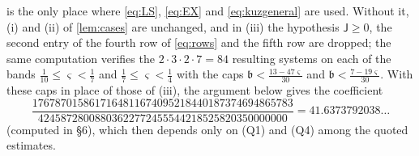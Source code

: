 \documentclass[11pt,colorlinks]{charlie}
\begin{document}
\begin{remark}\label{rem:fallback}
 is the only place where \eqref{eq:LS}, \eqref{eq:EX} and \eqref{eq:kuzgeneral} are used. Without it, (i) and (ii) of \cref{lem:cases} are unchanged, and in (iii) the hypothesis $\mathsf J\ge0$, the second entry of the fourth row of \eqref{eq:rows} and the fifth row are dropped; the same computation verifies the $2\cdot3\cdot2\cdot7=84$ resulting systems on each of the bands $\frac1{10}\le\varsigma<\frac17$ and $\frac17\le\varsigma<\frac14$ with the caps $\mathfrak b<\frac{13-47\varsigma}{30}$ and $\mathfrak b<\frac{7-19\varsigma}{30}$. With these caps in place of those of (iii), the argument below gives the coefficient
\[
 \frac{1767870158617164811674095218440187374694865783}{42458728008803622772455544218525820350000000}=41.6373792038\ldots
\]
(computed in \S6), which then depends only on (Q1) and (Q4) among the quoted estimates.
\end{remark}
\end{document}
